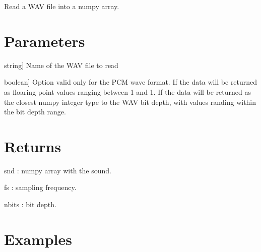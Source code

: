 \documentclass[letterpaper,10pt,english]{sphinxmanual}
\begin{document}
\begin{fulllineitems}
\label{\detokenize{intro:wavpy.wavread}}
\pysigstartsignatures
{}
\pysigstopsignatures
\sphinxAtStartPar
Read a WAV file into a numpy array.


\section{Parameters}
\label{\detokenize{intro:id1}}\begin{description}
\sphinxlineitem{fName}{[}string{]}
\sphinxAtStartPar
Name of the WAV file to read

\sphinxlineitem{scale}{[}boolean{]}
\sphinxAtStartPar
Option valid only for the PCM wave format. If  the
data will be returned as floaring point values ranging
between \sphinxhyphen{}1 and 1. If  the data will be returned
as the closest numpy integer type to the WAV bit depth,
with values randing within the bit depth range.

\end{description}


\section{Returns}
\label{\detokenize{intro:returns}}
\sphinxAtStartPar
snd : numpy array with the sound.

\sphinxAtStartPar
fs : sampling frequency.

\sphinxAtStartPar
nbits : bit depth.


\section{Examples}
\label{\detokenize{intro:id2}}
\begin{sphinxVerbatim}[commandchars=\\\{\}]
    
\end{sphinxVerbatim}

\end{fulllineitems}

\end{document}
